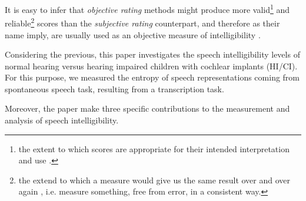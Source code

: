 It is easy to infer that \textit{objective rating} methods might produce more valid\footnote{the extent to which scores are appropriate for their intended interpretation and use \citep{Lesterhuis_2018, Trochim_2022}.} and reliable\footnote{the extend to which a measure would give us the same result over and over again \citep{Trochim_2022}, i.e. measure something, free from error, in a consistent way.} scores than the \textit{subjective rating} counterpart, and therefore as their name imply, are usually used as an objective measure of intelligibility \citep{Boonen_et_al_2021, Faes_et_al_2021}.

Considering the previous, this paper investigates the speech intelligibility levels of normal hearing versus hearing impaired children with cochlear implants (HI/CI). For this purpose, we measured the entropy of speech representations coming from spontaneous speech task, resulting from a transcription task. 

\begin{comment}
add previous evidence about this comparison
\end{comment}

Moreover, the paper make three specific contributions to the measurement and analysis of speech intelligibility. 

\begin{comment}
First, we develop a novel analysis of speech intelligibility using a latent variable approach. More specifically, we model SI as a latent variable inferred from entropy measures coming from the transcription task. This method has XX specific benefits. First, it allows to construct a speech intelligibility score at the children level, which in turn allow us to make comparisons at the individual level. Second, it allow us to control for different types of sources of variation: individual variation (some hypothesis say there is a lot variation in this level), block effects (coming from the experimental design), and measurement error (resulting from the nested structure of measurement), which later allow us to test hypothesis at appropriate levels. Finally, it also measures the reliability (variability) of the transcription task.

Second, we describe in detail the sources of variation in speech intelligibility based on a set of covariates of interest. We supplement our description of the sources of variation with a causal analysis of the factors influencing this variation mention evidence on hearing age, etiology and pta. It is important to understand that a cochlear implant partially restores a severe-to-profound sensorineural hearing loss, i.e. the signal provided by the apparatus is still degraded compared to the signal in normal hearing (Drennan, \& Rubinstein, 2008). However, even under this condition, the device enables children with severe-to-profound hearing impairment to perceive speech and other environmental sounds.

Finally, we wrap the full analysis procedure under the bayesian framework, providing the steps, assumptions and computational implementation of the method.
\end{comment}
